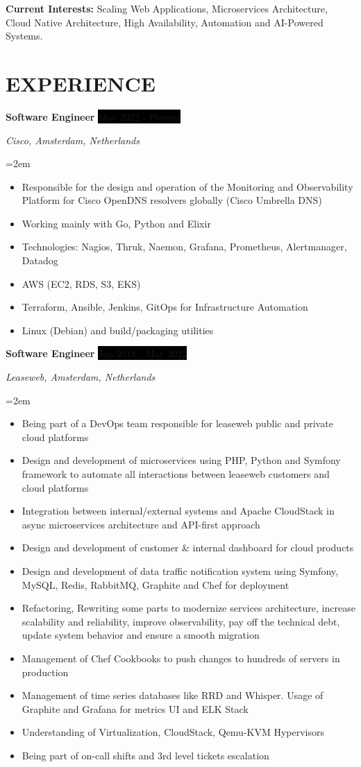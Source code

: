 \documentclass[paper=a4,fontsize=11pt]{scrartcl} %
\newcommand{\sepspace}{\vspace*{1em}}		%
\newcommand{\NewPart}[1]{\section*{\uppercase{#1}}}
\newcommand{\EducationEntry}[4]{
		\noindent \textbf{#1} \hfill      %
		\colorbox{Black}{%
			\parbox{6em}{%
			\hfill\color{White}#2}} \par  %
		\noindent \textit{#3} \par        %
		\noindent\hangindent=2em\hangafter=0 \small #4 %
		\normalsize \par}
\newcommand{\WorkEntry}[4]{				  %
		\noindent \textbf{#1} \hfill      %
		\colorbox{Black}{\color{White}#2} \par  %
		\noindent \textit{#3} \par              %
		\noindent\hangindent=2em\hangafter=0 \small #4 %
		\normalsize \par}
\begin{document}
\sepspace

\textbf{Current Interests:} Scaling Web Applications, Microservices Architecture, Cloud Native Architecture, High Availability, Automation and AI-Powered Systems.

\sepspace


\NewPart{Experience}{}

\WorkEntry{Software Engineer}{May 2022 - Present}{Cisco, Amsterdam, Netherlands}{\begin{itemize}
\item Responsible for the design and operation of the Monitoring and Observability Platform for Cisco OpenDNS resolvers globally (Cisco Umbrella DNS)
\item Working mainly with Go, Python and Elixir
\item Technologies: Nagios, Thruk, Naemon, Grafana, Prometheus, Alertmanager, Datadog
\item AWS (EC2, RDS, S3, EKS)
\item Terraform, Ansible, Jenkins, GitOps for Infrastructure Automation
\item Linux (Debian) and build/packaging utilities
\end{itemize}}
\sepspace

\WorkEntry{Software Engineer}{Jan 2018 - May 2022}{Leaseweb, Amsterdam, Netherlands}{\begin{itemize}
\item Being part of a DevOps team responsible for leaseweb public and private cloud platforms
\item Design and development of microservices using PHP, Python and Symfony framework to automate all interactions between leaseweb customers and cloud platforms
\item Integration between internal/external systems and Apache CloudStack in async microservices architecture and API-first approach
\item Design and development of customer \& internal dashboard for cloud products
\item Design and development of data traffic notification system using Symfony, MySQL, Redis, RabbitMQ, Graphite and Chef for deployment
\item Refactoring, Rewriting some parts to modernize services architecture, increase scalability and reliability, improve observability, pay off the technical debt, update system behavior and ensure a smooth migration
\item Management of Chef Cookbooks to push changes to hundreds of servers in production
\item Management of time series databases like RRD and Whisper. Usage of Graphite and Grafana for metrics UI and ELK Stack
\item Understanding of Virtualization, CloudStack, Qemu-KVM Hypervisors
\item Being part of on-call shifts and 3rd level tickets escalation
\end{itemize}}
\sepspace
\end{document}

